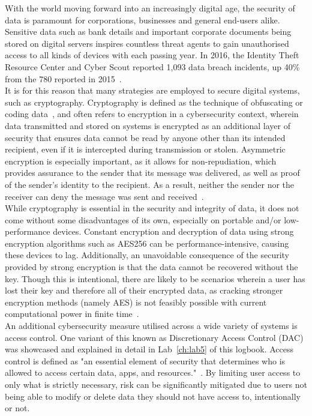 \documentclass[12pt]{report}
\begin{document}
    With the world moving forward into an increasingly digital age, the security of data is paramount for
    corporations, businesses and general end-users alike.
    Sensitive data such as bank details and important corporate documents being stored on digital servers inspires
    countless threat agents to gain unauthorised access to all kinds of devices with each passing year.
    In 2016, the Identity Theft Resource Center and Cyber Scout reported 1,093 data breach incidents, up 40\%
    from the 780 reported in 2015~\autocite{DataBreaches}.\\

    \noindent It is for this reason that many strategies are employed to secure digital systems, such as cryptography.
    Cryptography is defined as the technique of obfuscating or coding data~\autocite{KSCryptography}, and often refers
    to encryption in a cybersecurity context, wherein data transmitted and stored on systems
    is encrypted as an additional layer of security that ensures data cannot be read by anyone other than its
    intended recipient, even if it is intercepted during transmission or stolen.
    Asymmetric encryption is especially important, as it allows for non-repudiation, which provides
    assurance to the sender that its message was delivered, as well as proof of the sender's identity to the recipient.
    As a result, neither the sender nor the receiver can deny the message was sent and received~\autocite{NR}.\\

    \noindent While cryptography is essential in the security and integrity of data, it does not come
    without some disadvantages of its own, especially on portable and/or low-performance devices.
    Constant encryption and decryption of data using strong encryption algorithms such as AES256 can be
    performance-intensive, causing these devices to lag.
    Additionally, an unavoidable consequence of the security provided by strong encryption is that the data
    cannot be recovered without the key.
    Though this is intentional, there are likely to be scenarios wherein a user has lost their key and therefore
    all of their encrypted data, as cracking stronger encryption methods (namely AES) is not feasibly possible with
    current computational power in finite time~\autocite{AESFinite}.\\

    \noindent An additional cybersecurity measure utilised across a wide variety of systems is access control.
    One variant of this known as Discretionary Access Control (DAC) was showcased and explained in detail
    in Lab~\ref{ch:lab5} of this logbook.
    Access control is defined as "an essential element of security that determines who is allowed to
    access certain data, apps, and resources."~\autocite{AccessControlMS}.
    By limiting user access to only what is strictly necessary, risk can be significantly mitigated due to
    users not being able to modify or delete data they should not have access to, intentionally or not.\\
\end{document}
